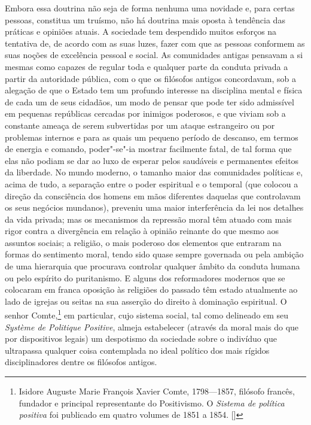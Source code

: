 Embora essa doutrina não seja de forma nenhuma uma novidade e, para
certas pessoas, constitua um truísmo, não há doutrina 
mais oposta à tendência das práticas e opiniões atuais. A sociedade tem
despendido muitos esforços na tentativa de, de acordo com as suas luzes,
fazer com que as pessoas conformem as suas noções de excelência pessoal e
social. As comunidades antigas pensavam a si mesmas como
capazes de regular toda e qualquer parte da conduta privada a partir da
autoridade pública, com o que os filósofos antigos concordavam, sob a
alegação de que o Estado tem um profundo interesse na disciplina mental
e física de cada um de seus cidadãos, um modo de pensar que pode ter
sido admissível em pequenas repúblicas cercadas por inimigos poderosos,
e que viviam sob a constante ameaça de serem subvertidas por um ataque
estrangeiro ou por problemas internos e para as quais um pequeno
período de descanso, em termos de energia e comando, poder"-se"-ia
mostrar facilmente fatal, de tal forma que elas não podiam se dar ao
luxo de esperar pelos saudáveis e permanentes efeitos da liberdade. No
mundo moderno, o tamanho maior das comunidades políticas e, acima de
tudo, a separação entre o poder espiritual e o temporal (que colocou
a direção da consciência dos homens em mãos diferentes daquelas que
controlavam os seus negócios mundanos), preveniu uma maior interferência
da lei nos detalhes da vida privada; mas os mecanismos da repressão
moral têm atuado com mais rigor contra a divergência em relação à opinião reinante
do que mesmo aos assuntos sociais; a religião, o mais poderoso dos
elementos que entraram na formas do sentimento moral, tendo sido
quase sempre governada ou pela ambição de uma hierarquia que procurava
controlar qualquer âmbito da conduta humana ou pelo
espírito do puritanismo. E alguns dos reformadores modernos que se
colocaram em franca oposição às religiões do passado têm estado
atualmente ao lado de igrejas ou seitas na sua asserção do direito à 
dominação espiritual. O senhor Comte,\footnote{ Isidore Auguste Marie
François Xavier Comte, 1798---1857, filósofo francês, fundador e
principal representante do Positivismo. O \textit{Sistema de política
positiva} foi publicado em quatro volumes de 1851 a 1854. []} em
particular, cujo sistema social, tal como delineado em seu
\textit{Système de Politique Positive}, almeja estabelecer (através da
moral mais do que por dispositivos legais) um despotismo da sociedade
sobre o indivíduo que ultrapassa qualquer coisa contemplada no ideal
político dos mais rígidos disciplinadores dentre os filósofos antigos.

